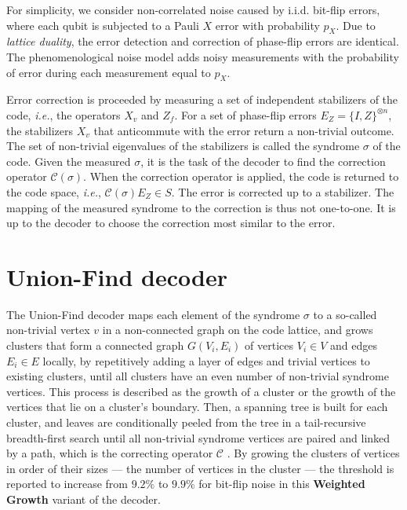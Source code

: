 For simplicity, we consider non-correlated noise caused by i.i.d. bit-flip errors, where each qubit is subjected to a Pauli $X$ error with probability $p_X$. Due to \emph{lattice duality}, the error detection and correction of phase-flip errors are identical. The phenomenological noise model adds noisy measurements with the probability of error during each measurement equal to $p_X$. 

Error correction is proceeded by measuring a set of independent stabilizers of the code, \emph{i.e.}, the operators $X_v$ and $Z_f$. For a set of phase-flip errors $E_Z = \{I,Z\}^{\otimes n}$, the stabilizers $X_v$ that anticommute with the error return a non-trivial outcome. The set of non-trivial eigenvalues of the stabilizers is called the syndrome $\sigma$ of the code. Given the measured $\sigma$, it is the task of the decoder to find the correction operator $\mathcal{C}(\sigma)$. When the correction operator is applied, the code is returned to the code space, \emph{i.e.}, $\mathcal{C}(\sigma)E_Z \in S$. The error is corrected up to a stabilizer. The mapping of the measured syndrome to the correction is thus not one-to-one. It is up to the decoder to choose the correction most similar to the error. 

\section{Union-Find decoder}\label{sec:unionfind}

The Union-Find decoder \cite{delfosse2017almost} maps each element of the syndrome $\sigma$ to a so-called non-trivial vertex $v$ in a non-connected graph on the code lattice, and grows clusters that form a connected graph $G(V_i, E_i)$ of vertices $V_i\in V$ and edges $E_i \in E$ locally, by repetitively adding a layer of edges and trivial vertices to existing clusters, until all clusters have an even number of non-trivial syndrome vertices. This process is described as the growth of a cluster or the growth of the vertices that lie on a cluster's boundary. Then, a spanning tree is built for each cluster, and leaves are conditionally peeled from the tree in a tail-recursive breadth-first search until all non-trivial syndrome vertices are paired and linked by a path, which is the correcting operator $\mathcal{C}$ \cite{delfosse2017linear}. By growing the clusters of vertices in order of their sizes --- the number of vertices in the cluster --- the threshold is reported to increase from $9.2\%$ to $9.9\%$ for bit-flip noise in this \textbf{Weighted Growth} variant of the decoder.

